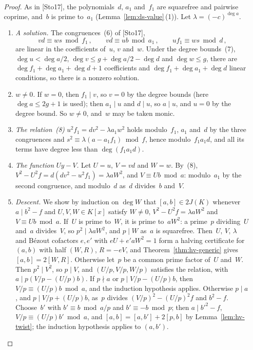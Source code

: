 \begin{proof}
\leanok
{}
As in [Sto17], the polynomials~$d$, $a_1$ and~$f_1$ are squarefree and pairwise coprime, and~$b$
is prime to~$a_1$ (Lemma~\ref{lem:ds-value}\,(1)). Let $\lambda = (-c)^{\deg a}$.
\begin{enumerate}
  \item \emph{A solution.} The congruences~(6) of [Sto17],
    \[ vd \equiv ws \bmod f_1\,, \qquad vd \equiv ub \bmod a_1\,, \qquad
       uf_1 \equiv ws \bmod d\,, \]
    are linear in the coefficients of~$u$, $v$ and~$w$. Under the degree bounds~(7),
    $\deg u < \deg a/2$, $\deg v \le g + \deg a/2 - \deg d$ and $\deg w \le g$, there are
    $\deg f_1 + \deg a_1 + \deg d + 1$ coefficients and $\deg f_1 + \deg a_1 + \deg d$ linear
    conditions, so there is a nonzero solution.
  \item \emph{$w \ne 0$.} If $w = 0$, then $f_1 \mid v$, so $v = 0$ by the degree bounds (here
    $\deg a \le 2g + 1$ is used); then $a_1 \mid u$ and $d \mid u$, so $a \mid u$, and $u = 0$ by
    the degree bound. So $w \ne 0$, and~$w$ may be taken monic.
  \item \emph{The relation~(8)} $u^2f_1 = dv^2 - \lambda a_1w^2$ holds modulo~$f_1$, $a_1$ and~$d$
    by the three congruences and $s^2 \equiv \lambda(a - a_1f_1) \bmod f$, hence
    modulo~$f_1a_1d$, and all its terms have degree less than $\deg(f_1a_1d)$.
  \item \emph{The function $Uy - V$.} Let $U = u$, $V = vd$ and $W = w$. By~(8),
    $V^2 - U^2f = d(dv^2 - u^2f_1) = \lambda aW^2$, and $V \equiv Ub \bmod a$: modulo~$a_1$ by the
    second congruence, and modulo~$d$ as~$d$ divides~$b$ and~$V$.
  \item \emph{Descent.} We show by induction on $\deg W$ that $[a, b] \in 2J(K)$ whenever
    $a \mid b^2 - f$ and $U, V, W \in K[x]$ satisfy $W \ne 0$, $V^2 - U^2f = \lambda aW^2$ and
    $V \equiv Ub \bmod a$. If~$U$ is prime to~$W$, it is prime to~$aW^2$: a prime~$p$
    dividing~$U$ and~$a$ divides~$V$, so $p^2 \mid \lambda aW^2$, and $p \mid W$ as~$a$ is
    squarefree. Then~$U$, $V$, $\lambda$ and B\'ezout cofactors $e, e'$ with $eU + e'aW^2 = 1$
    form a halving certificate for $(a, b)$ with half $(W, R)$, $R = -eV$, and
    Theorem~\ref{thm:hv-generic} gives $[a, b] = 2[W, R]$. Otherwise let~$p$ be a common prime
    factor of~$U$ and~$W$. Then $p^2 \mid V^2$, so $p \mid V$, and $(U/p, V/p, W/p)$ satisfies the
    relation, with $a \mid p(V/p - (U/p)b)$. If $p \nmid a$ or $p \mid V/p - (U/p)b$, then
    $V/p \equiv (U/p)b \bmod a$, and the induction hypothesis applies. Otherwise $p \mid a$, and
    $p \mid V/p + (U/p)b$, as~$p$ divides $(V/p)^2 - (U/p)^2f$ and $b^2 - f$. Choose~$b'$ with
    $b' \equiv b \bmod a/p$ and $b' \equiv -b \bmod p$; then $a \mid b'^2 - f$,
    $V/p \equiv (U/p)b' \bmod a$, and $[a, b] = [a, b'] + 2[p, b]$ by Lemma~\ref{lem:hv-twist};
    the induction hypothesis applies to $(a, b')$.
\end{enumerate}


\end{proof}
